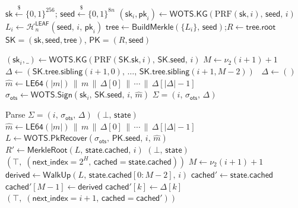 \documentclass[11pt]{article}
\newcommand{\hash}{\mathcal{H}}
\newcommand{\prf}{\mathrm{PRF}}
\newcommand{\secpar}{\lambda}
\newcommand{\bin}{\{0,1\}}
\newcommand{\concat}{\,\|\,}
\begin{document}
\begin{algorithm}[t]
\caption{$\mathsf{PUP.KeyGen}(1^\secpar)$}\label{alg:keygen}
\begin{algorithmic}[1]
\State $\mathsf{sk} \xleftarrow{\$} \bin^{256}$;\quad
$\mathsf{seed} \xleftarrow{\$} \bin^{8n}$
  \State $(\mathsf{sk}_i, \mathsf{pk}_i) \gets
  \mathsf{WOTS.KG}(\prf(\mathsf{sk}, i),\, \mathsf{seed},\, i)$
  \State $L_i \gets \hash_n^{\mathsf{LEAF}}(\mathsf{seed},\, i,\,
  \mathsf{pk}_i)$
\EndFor
\State $\mathsf{tree} \gets \mathsf{BuildMerkle}(\{L_i\},\,
\mathsf{seed})$;\quad $R \gets \mathsf{tree.root}$
\State \Return $\mathsf{SK} = (\mathsf{sk}, \mathsf{seed},
\mathsf{tree})$,\; $\mathsf{PK} = (R, \mathsf{seed})$
\end{algorithmic}
\end{algorithm}

\begin{algorithm}[t]
\caption{$\mathsf{PUP.Sign}(\mathsf{SK},\, m,\, i)$
\hfill \textit{// $i = \mathsf{state.next\_index}$}}
\label{alg:sign}
\begin{algorithmic}[1]
\State $(\mathsf{sk}_i, \_) \gets \mathsf{WOTS.KG}(\prf(\mathsf{SK.sk},
i),\, \mathsf{SK.seed},\, i)$
  \State $M \gets \nu_2(i + 1) + 1$
  \State $\Delta \gets
  (\mathsf{SK.tree.sibling}(i{+}1, 0),\, \ldots,\,
  \mathsf{SK.tree.sibling}(i{+}1, M{-}2))$
\Else\ $\Delta \gets ()$
\EndIf
\State $\hat{m} \gets \mathsf{LE64}(|m|) \concat m \concat
\Delta[0] \concat \cdots \concat \Delta[|\Delta|{-}1]$
\State $\sigma_{\mathsf{ots}} \gets \mathsf{WOTS.Sign}(\mathsf{sk}_i,
\, \mathsf{SK.seed},\, i,\, \hat{m})$
\State \Return $\Sigma = (i,\, \sigma_{\mathsf{ots}},\, \Delta)$
\end{algorithmic}
\end{algorithm}

\begin{algorithm}[t]
\caption{$\mathsf{PUP.Verify}(\mathsf{PK},\, m,\, \Sigma,\,
\mathsf{state})$}\label{alg:verify}
\begin{algorithmic}[1]
\State Parse $\Sigma = (i,\, \sigma_{\mathsf{ots}},\, \Delta)$
  \Return $(\bot,\, \mathsf{state})$
\EndIf
\State $\hat{m} \gets \mathsf{LE64}(|m|) \concat m \concat
\Delta[0] \concat \cdots \concat \Delta[|\Delta|{-}1]$
\State $L \gets \mathsf{WOTS.PkRecover}(\sigma_{\mathsf{ots}},\,
\mathsf{PK.seed},\, i,\, \hat{m})$
\State $R' \gets \mathsf{MerkleRoot}(L,\, \mathsf{state.cached},\, i)$
  \Return $(\bot,\, \mathsf{state})$
\EndIf
{}
  \Return $(\top,\; (\mathsf{next\_index}{=}2^H,\,
  \mathsf{cached}{=}\mathsf{state.cached}))$
\EndIf
\State $M \gets \nu_2(i + 1) + 1$
\State $\mathsf{derived} \gets \mathsf{WalkUp}(L,\,
\mathsf{state.cached}[0{:}M{-}2],\, i)$
\State $\mathsf{cached}' \gets \mathsf{state.cached}$
\State $\mathsf{cached}'[M{-}1] \gets \mathsf{derived}$
  \State $\mathsf{cached}'[k] \gets \Delta[k]$
\EndFor
\State \Return $(\top,\; (\mathsf{next\_index}{=}i{+}1,\,
\mathsf{cached}{=}\mathsf{cached}'))$
\end{algorithmic}
\end{algorithm}
\end{document}
